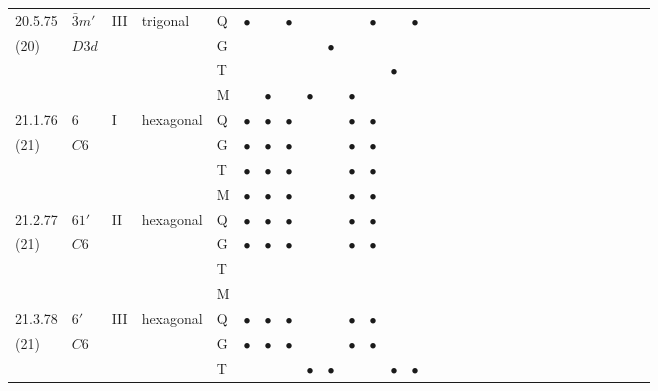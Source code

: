 \documentclass[fleqn,9pt,landscape]{jsarticle}
\begin{document}
\begin{longtable}{lllll|l|l|l|l|l|l|l|l|l|ll|ll|ll|ll|ll|ll|ll|ll}
20.5.75 & \texttt{$\bar{3}m'$} & III & trigonal & Q & $\bullet$ &  & $\bullet$ &  &  &  & $\bullet$ &  & $\bullet$ &  &  &  &  &  &  &  &  &  &  &  &  &  &  &  &  \\
(20) & $D3d$ &  &  & G &  &  &  &  & $\bullet$ &  &  &  &  &  &  &  &  &  &  &  &  &  &  &  &  &  &  &  &  \\
 &  &  &  & T &  &  &  &  &  &  &  & $\bullet$ &  &  &  &  &  &  &  &  &  &  &  &  &  &  &  &  &  \\
 &  &  &  & M &  & $\bullet$ &  & $\bullet$ &  & $\bullet$ &  &  &  &  &  &  &  &  &  &  &  &  &  &  &  &  &  &  &  \\ \hline
21.1.76 & \texttt{$6$} & I & hexagonal & Q & $\bullet$ & $\bullet$ & $\bullet$ &  &  & $\bullet$ & $\bullet$ &  &  &  &  &  &  &  &  &  &  &  &  &  &  &  &  &  &  \\
(21) & $C6$ &  &  & G & $\bullet$ & $\bullet$ & $\bullet$ &  &  & $\bullet$ & $\bullet$ &  &  &  &  &  &  &  &  &  &  &  &  &  &  &  &  &  &  \\
 &  &  &  & T & $\bullet$ & $\bullet$ & $\bullet$ &  &  & $\bullet$ & $\bullet$ &  &  &  &  &  &  &  &  &  &  &  &  &  &  &  &  &  &  \\
 &  &  &  & M & $\bullet$ & $\bullet$ & $\bullet$ &  &  & $\bullet$ & $\bullet$ &  &  &  &  &  &  &  &  &  &  &  &  &  &  &  &  &  &  \\ \hline
21.2.77 & \texttt{$61'$} & II & hexagonal & Q & $\bullet$ & $\bullet$ & $\bullet$ &  &  & $\bullet$ & $\bullet$ &  &  &  &  &  &  &  &  &  &  &  &  &  &  &  &  &  &  \\
(21) & $C6$ &  &  & G & $\bullet$ & $\bullet$ & $\bullet$ &  &  & $\bullet$ & $\bullet$ &  &  &  &  &  &  &  &  &  &  &  &  &  &  &  &  &  &  \\
 &  &  &  & T &  &  &  &  &  &  &  &  &  &  &  &  &  &  &  &  &  &  &  &  &  &  &  &  &  \\
 &  &  &  & M &  &  &  &  &  &  &  &  &  &  &  &  &  &  &  &  &  &  &  &  &  &  &  &  &  \\ \hline
21.3.78 & \texttt{$6'$} & III & hexagonal & Q & $\bullet$ & $\bullet$ & $\bullet$ &  &  & $\bullet$ & $\bullet$ &  &  &  &  &  &  &  &  &  &  &  &  &  &  &  &  &  &  \\
(21) & $C6$ &  &  & G & $\bullet$ & $\bullet$ & $\bullet$ &  &  & $\bullet$ & $\bullet$ &  &  &  &  &  &  &  &  &  &  &  &  &  &  &  &  &  &  \\
 &  &  &  & T &  &  &  & $\bullet$ & $\bullet$ &  &  & $\bullet$ & $\bullet$ &  &  &  &  &  &  &  &  &  &  &  &  &  &  &  &  \\

\end{longtable}
\end{document}
